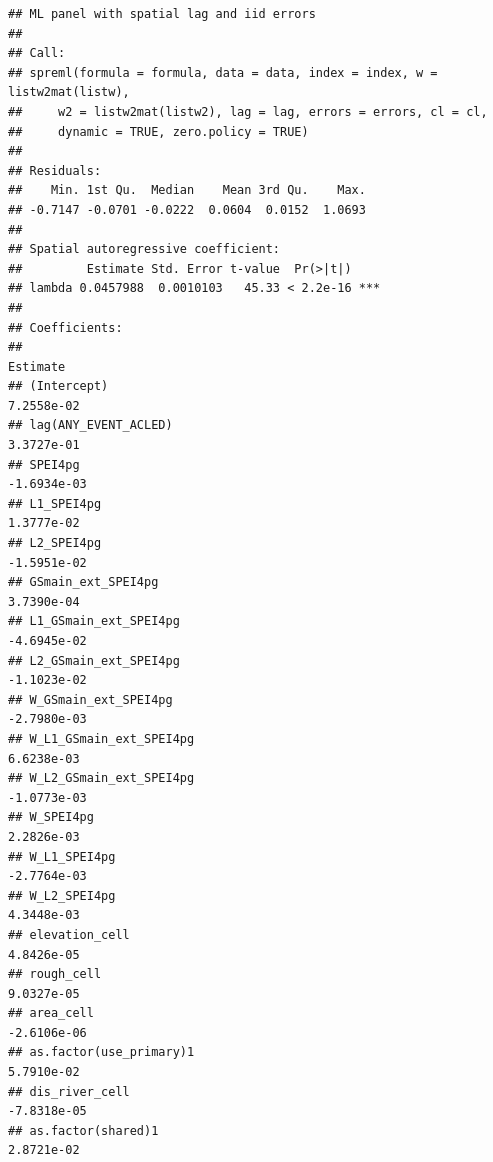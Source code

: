 \documentclass[
  a4paper,
]{article}
\begin{document}
\begin{verbatim}
## ML panel with spatial lag and iid errors 
## 
## Call:
## spreml(formula = formula, data = data, index = index, w = listw2mat(listw), 
##     w2 = listw2mat(listw2), lag = lag, errors = errors, cl = cl, 
##     dynamic = TRUE, zero.policy = TRUE)
## 
## Residuals:
##    Min. 1st Qu.  Median    Mean 3rd Qu.    Max. 
## -0.7147 -0.0701 -0.0222  0.0604  0.0152  1.0693 
## 
## Spatial autoregressive coefficient:
##         Estimate Std. Error t-value  Pr(>|t|)    
## lambda 0.0457988  0.0010103   45.33 < 2.2e-16 ***
## 
## Coefficients:
##                                                                                      Estimate
## (Intercept)                                                                        7.2558e-02
## lag(ANY_EVENT_ACLED)                                                               3.3727e-01
## SPEI4pg                                                                           -1.6934e-03
## L1_SPEI4pg                                                                         1.3777e-02
## L2_SPEI4pg                                                                        -1.5951e-02
## GSmain_ext_SPEI4pg                                                                 3.7390e-04
## L1_GSmain_ext_SPEI4pg                                                             -4.6945e-02
## L2_GSmain_ext_SPEI4pg                                                             -1.1023e-02
## W_GSmain_ext_SPEI4pg                                                              -2.7980e-03
## W_L1_GSmain_ext_SPEI4pg                                                            6.6238e-03
## W_L2_GSmain_ext_SPEI4pg                                                           -1.0773e-03
## W_SPEI4pg                                                                          2.2826e-03
## W_L1_SPEI4pg                                                                      -2.7764e-03
## W_L2_SPEI4pg                                                                       4.3448e-03
## elevation_cell                                                                     4.8426e-05
## rough_cell                                                                         9.0327e-05
## area_cell                                                                         -2.6106e-06
## as.factor(use_primary)1                                                            5.7910e-02
## dis_river_cell                                                                    -7.8318e-05
## as.factor(shared)1                                                                 2.8721e-02

\end{verbatim}
\end{document}
